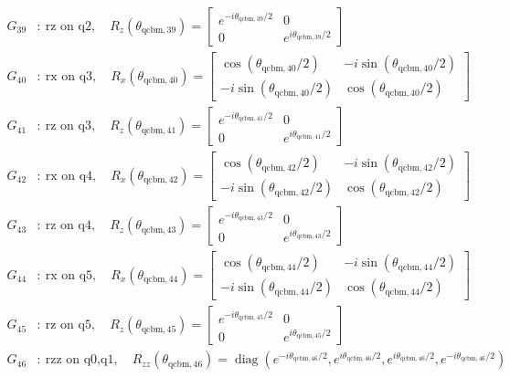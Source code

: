 \begin{align*}
G_{39}&:\ \text{rz on q2},\quad R_z(\theta_{\mathrm{qcbm},39})=\begin{bmatrix}e^{-i\theta_{\mathrm{qcbm},39}/2}&0\\0&e^{i\theta_{\mathrm{qcbm},39}/2}\end{bmatrix}\\
G_{40}&:\ \text{rx on q3},\quad R_x(\theta_{\mathrm{qcbm},40})=\begin{bmatrix}\cos(\theta_{\mathrm{qcbm},40}/2)&-i\sin(\theta_{\mathrm{qcbm},40}/2)\\-i\sin(\theta_{\mathrm{qcbm},40}/2)&\cos(\theta_{\mathrm{qcbm},40}/2)\end{bmatrix}\\
G_{41}&:\ \text{rz on q3},\quad R_z(\theta_{\mathrm{qcbm},41})=\begin{bmatrix}e^{-i\theta_{\mathrm{qcbm},41}/2}&0\\0&e^{i\theta_{\mathrm{qcbm},41}/2}\end{bmatrix}\\
G_{42}&:\ \text{rx on q4},\quad R_x(\theta_{\mathrm{qcbm},42})=\begin{bmatrix}\cos(\theta_{\mathrm{qcbm},42}/2)&-i\sin(\theta_{\mathrm{qcbm},42}/2)\\-i\sin(\theta_{\mathrm{qcbm},42}/2)&\cos(\theta_{\mathrm{qcbm},42}/2)\end{bmatrix}\\
G_{43}&:\ \text{rz on q4},\quad R_z(\theta_{\mathrm{qcbm},43})=\begin{bmatrix}e^{-i\theta_{\mathrm{qcbm},43}/2}&0\\0&e^{i\theta_{\mathrm{qcbm},43}/2}\end{bmatrix}\\
G_{44}&:\ \text{rx on q5},\quad R_x(\theta_{\mathrm{qcbm},44})=\begin{bmatrix}\cos(\theta_{\mathrm{qcbm},44}/2)&-i\sin(\theta_{\mathrm{qcbm},44}/2)\\-i\sin(\theta_{\mathrm{qcbm},44}/2)&\cos(\theta_{\mathrm{qcbm},44}/2)\end{bmatrix}\\
G_{45}&:\ \text{rz on q5},\quad R_z(\theta_{\mathrm{qcbm},45})=\begin{bmatrix}e^{-i\theta_{\mathrm{qcbm},45}/2}&0\\0&e^{i\theta_{\mathrm{qcbm},45}/2}\end{bmatrix}\\
G_{46}&:\ \text{rzz on q0,q1},\quad R_{zz}(\theta_{\mathrm{qcbm},46})=\operatorname{diag}(e^{-i\theta_{\mathrm{qcbm},46}/2},e^{i\theta_{\mathrm{qcbm},46}/2},e^{i\theta_{\mathrm{qcbm},46}/2},e^{-i\theta_{\mathrm{qcbm},46}/2})\\

\end{align*}
